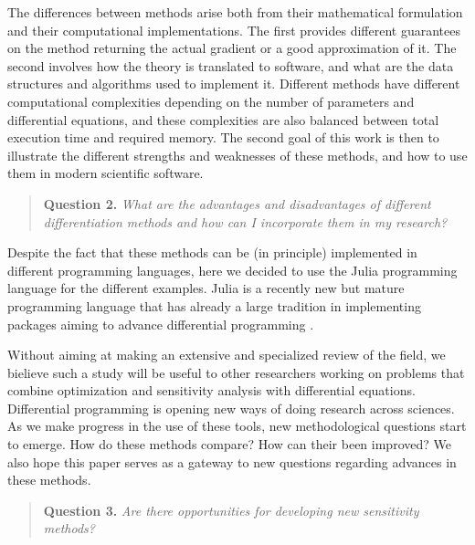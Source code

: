 The differences between methods arise both from their mathematical formulation and their computational implementations. 
The first provides different guarantees on the method returning the actual gradient or a good approximation of it. 
The second involves how the theory is translated to software, and what are the data structures and algorithms used to implement it. 
Different methods have different computational complexities depending on the number of parameters and differential equations, and these complexities are also balanced between total execution time and required memory. 
The second goal of this work is then to illustrate the different strengths and weaknesses of these methods, and how to use them in modern scientific software. 
\begin{quote}
    \textbf{Question 2. }
    \textit{What are the advantages and disadvantages of different differentiation methods and how can I incorporate them in my research?}
\end{quote}
Despite the fact that these methods can be (in principle) implemented in different programming languages, here we decided to use the Julia programming language for the different examples. 
Julia is a recently new but mature programming language that has already a large tradition in implementing packages aiming to advance differential programming \cite{Julialang_2017}. 

Without aiming at making an extensive and specialized review of the field, we bielieve such a study will be useful to other researchers working on problems that combine optimization and sensitivity analysis with differential equations.
Differential programming is opening new ways of doing research across sciences. 
As we make progress in the use of these tools, new methodological questions start to emerge. 
How do these methods compare? How can their been improved? 
We also hope this paper serves as a gateway to new questions regarding advances in these methods. 

\begin{quote}
    \textbf{Question 3. }
    \textit{Are there opportunities for developing new sensitivity methods?}
\end{quote}


